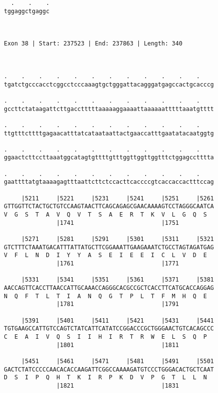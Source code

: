 \documentclass{article}
\begin{document}
\begin{Verbatim}
  .    .    .
tggaggctgaggc
             
             
 
Exon 38 | Start: 237523 | End: 237863 | Length: 340



.    .    .    .    .    .    .    .    .    .    .    .    
tgatctgcccacctcggcctcccaaagtgctgggattacagggatgagccactgcacccg
                                                            
.    .    .    .    .    .    .    .    .    .    .    .    
gccttctataagattcttgacctttttaaaaaggaaaattaaaaaatttttaaatgtttt
                                                            
.    .    .    .    .    .    .    .    .    .    .    .    
ttgtttcttttgagaacatttatcataataattactgaaccatttgaatatacaatggtg
                                                            
.    .    .    .    .    .    .    .    .    .    .    .    
ggaactcttccttaaatggcatagtgttttgtttggttggttggtttctggagcctttta
                                                            
.    .    .    .    .    .    .    .    .    .    .    .    
gaattttatgtaaaagagtttaattcttctccacttcaccccgtcaccaccactttccag
                                                            
     |5211     |5221     |5231     |5241     |5251     |5261
GTTGGTTCTACTGCTGTCCAAGTAACTTCAGCAGAGCGAACAAAAGTCCTAGGGCAATCA
V  G  S  T  A  V  Q  V  T  S  A  E  R  T  K  V  L  G  Q  S  
               |1741                         |1751          
  
     |5271     |5281     |5291     |5301     |5311     |5321
GTCTTTCTAAATGACATTTATTATGCTTCGGAAATTGAAGAAATCTGCCTAGTAGATGAG
V  F  L  N  D  I  Y  Y  A  S  E  I  E  E  I  C  L  V  D  E  
               |1761                         |1771          
  
     |5331     |5341     |5351     |5361     |5371     |5381
AACCAGTTCACCTTAACCATTGCAAACCAGGGCACGCCGCTCACCTTCATGCACCAGGAG
N  Q  F  T  L  T  I  A  N  Q  G  T  P  L  T  F  M  H  Q  E  
               |1781                         |1791          
  
     |5391     |5401     |5411     |5421     |5431     |5441
TGTGAAGCCATTGTCCAGTCTATCATTCATATCCGGACCCGCTGGGAACTGTCACAGCCC
C  E  A  I  V  Q  S  I  I  H  I  R  T  R  W  E  L  S  Q  P  
               |1801                         |1811          
  
     |5451     |5461     |5471     |5481     |5491     |5501
GACTCTATCCCCCAACACACCAAGATTCGGCCAAAAGATGTCCCTGGGACACTGCTCAAT
D  S  I  P  Q  H  T  K  I  R  P  K  D  V  P  G  T  L  L  N  
               |1821                         |1831          
  

\end{Verbatim}
\end{document}

